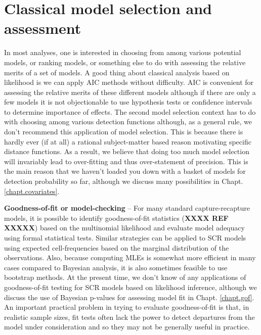 \section{Classical model selection and assessment}

In most analyses, one is interested in choosing from among various
potential models, or ranking models, or something else to do with
assessing the relative merits of a set of models. A good thing about
classical analysis based on likelihood is we can apply AIC methods
\citep{burnham_anderson:2002} without difficulty. 
AIC is convenient for assessing the relative
merits of these different models although if there are only a few
models it is not objectionable to use hypothesis tests or confidence
intervals to determine importance of effects. 
The second model
selection context has to do with choosing among various detection
functions although, as a general rule, we don't recommend this
application of model selection.  This is because there is hardly ever
(if at all) a rational subject-matter based reason motivating specific
distance functions. As a result, we believe that doing too much model
selection will invariably lead to over-fitting and thus over-statement
of precision. This is the main reason that we haven't loaded you down
with a basket of models for detection probability so far, although we
discuss many possibilities in Chapt. \ref{chapt.covariates}.


{\bf Goodness-of-fit or model-checking} -- For many standard capture-recapture models,
it is possible to identify goodness-of-fit statistics ({\bf XXXX REF XXXXX})
based on the
multinomial likelihood and evaluate model adequacy using formal
statistical tests. Similar strategies can be applied to SCR models
using expected cell-frequencies based on the marginal distribution of
the observations. Also, because computing MLEs is somewhat more
efficient in many cases compared to Bayesian analysis, it is also
sometimes feasible to use bootstrap methods. At the present time,
we don't know of any applications of goodness-of-fit testing for SCR
models based on likelihood inference, although we discuss the use of
Bayesian p-values for assessing model fit in Chapt. \ref{chapt.gof}. An
important practical problem in trying to evaluate  goodness-of-fit is
that, in realistic sample sizes, fit tests often lack the power to
detect departures from the model under consideration and so they may
not be generally useful in practice. 


